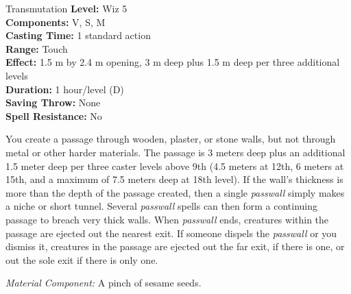 {Transmutation}
{
	\textbf{Level:}
	Wiz 5\\
	\textbf{Components:}
	V, S, M\\
	\textbf{Casting Time:}
	1 standard action\\
	\textbf{Range:}
	Touch\\
	\textbf{Effect:}
	1.5 m by 2.4 m opening, 3 m deep plus 1.5 m deep per three additional levels\\
	\textbf{Duration:}
	1 hour/level (D)\\
	\textbf{Saving Throw:}
	None\\
	\textbf{Spell Resistance:}
	No\\
}
{
	You create a passage through wooden, plaster, or stone walls, but not through metal or other harder materials. The passage is 3 meters deep plus an additional 1.5 meter deep per three caster levels above 9th (4.5 meters at 12th, 6 meters at 15th, and a maximum of 7.5 meters deep at 18th level). If the wall's thickness is more than the depth of the passage created, then a single \emph{passwall} simply makes a niche or short tunnel. Several \emph{passwall} spells can then form a continuing passage to breach very thick walls. When \emph{passwall} ends, creatures within the passage are ejected out the nearest exit. If someone dispels the \emph{passwall} or you dismiss it, creatures in the passage are ejected out the far exit, if there is one, or out the sole exit if there is only one.

	\textit{Material Component:}
	A pinch of sesame seeds.

}

